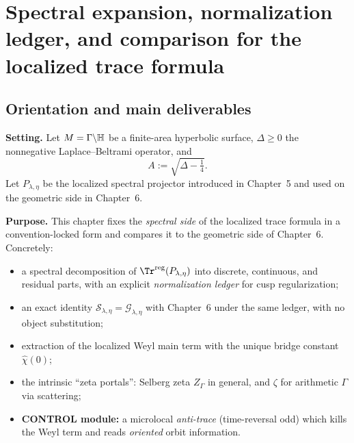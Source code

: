 
\chapter{Spectral expansion, normalization ledger, and comparison for the localized trace formula}
\label{chap:ch7-spectral-comparison}

\section*{Orientation and main deliverables}\label{sec:ch7-orientation}

\noindent\textbf{Setting.}
Let $M=\Gamma\backslash\mathbb{H}$ be a finite-area hyperbolic surface, $\Delta\ge 0$ the nonnegative Laplace--Beltrami operator,
and
\[
A:=\sqrt{\Delta-\tfrac14}.
\]
Let $P_{\lambda,\eta}$ be the localized spectral projector introduced in Chapter~5 and used on the geometric side in
Chapter~6.

\medskip
\noindent\textbf{Purpose.}
This chapter fixes the \emph{spectral side} of the localized trace formula in a convention-locked form and compares it to
the geometric side of Chapter~6. Concretely:
\begin{itemize}
\item[(S7.1)] a spectral decomposition of $\Tr^{\mathrm{reg}}(P_{\lambda,\eta})$ into discrete, continuous, and residual parts,
with an explicit \emph{normalization ledger} for cusp regularization;
\item[(S7.2)] an exact identity $\mathcal S_{\lambda,\eta}=\mathcal G_{\lambda,\eta}$ with Chapter~6 under the same ledger,
with no object substitution;
\item[(S7.3)] extraction of the localized Weyl main term with the unique bridge constant $\widehat\chi(0)$;
\item[(S7.4)] the intrinsic ``zeta portals'': Selberg zeta $Z_\Gamma$ in general, and $\zeta$ for arithmetic $\Gamma$ via scattering;
\item[(S7.5)] \textbf{CONTROL module:} a microlocal \emph{anti-trace} (time-reversal odd) which kills the Weyl term and reads
\emph{oriented} orbit information.
\end{itemize}

